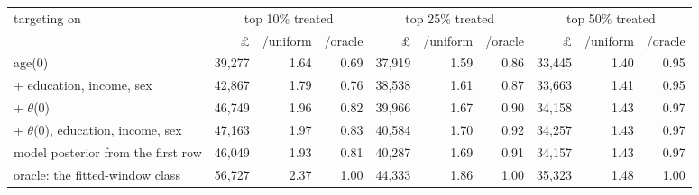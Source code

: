 \begin{tabular}{lrrrrrrrrr}
\toprule
targeting on & \multicolumn{3}{c}{top 10\% treated} & \multicolumn{3}{c}{top 25\% treated} & \multicolumn{3}{c}{top 50\% treated} \\
\cmidrule(lr){2-4} \cmidrule(lr){5-7} \cmidrule(lr){8-10}
 & \pounds & /uniform & /oracle & \pounds & /uniform & /oracle & \pounds & /uniform & /oracle \\
\midrule
age(0) & 39,277 & 1.64 & 0.69 & 37,919 & 1.59 & 0.86 & 33,445 & 1.40 & 0.95 \\
+ education, income, sex & 42,867 & 1.79 & 0.76 & 38,538 & 1.61 & 0.87 & 33,663 & 1.41 & 0.95 \\
+ $\theta$(0) & 46,749 & 1.96 & 0.82 & 39,966 & 1.67 & 0.90 & 34,158 & 1.43 & 0.97 \\
+ $\theta$(0), education, income, sex & 47,163 & 1.97 & 0.83 & 40,584 & 1.70 & 0.92 & 34,257 & 1.43 & 0.97 \\
model posterior from the first row & 46,049 & 1.93 & 0.81 & 40,287 & 1.69 & 0.91 & 34,157 & 1.43 & 0.97 \\
oracle: the fitted-window class & 56,727 & 2.37 & 1.00 & 44,333 & 1.86 & 1.00 & 35,323 & 1.48 & 1.00 \\
\bottomrule
\end{tabular}
